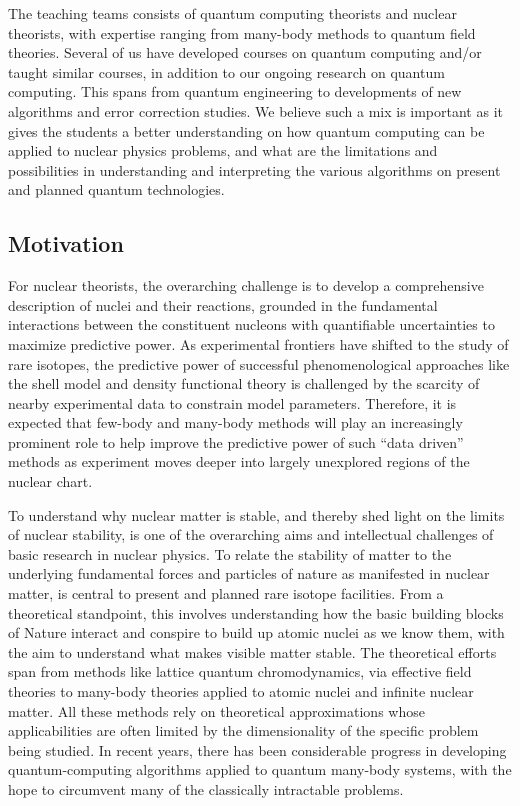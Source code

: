 \documentclass[superscriptaddress,amsmath,amssymb,aps,floatfix]{revtex4-2}
\begin{document}
The teaching teams consists of quantum computing theorists and nuclear
theorists, with expertise ranging from many-body methods to quantum
field theories. Several of us have developed courses on quantum
computing and/or taught similar courses, in addition to our ongoing
research on quantum computing. This spans from quantum engineering to
developments of new algorithms and error correction studies. We
believe such a mix is important as it gives the students a better
understanding on how quantum computing can be applied to nuclear
physics problems, and what are the limitations and possibilities in
understanding and interpreting the various algorithms on present and
planned quantum technologies.

\subsection{Motivation}\label{motivation}

For nuclear theorists, the overarching challenge is to develop a
comprehensive description of nuclei and their reactions, grounded in
the fundamental interactions between the constituent nucleons with
quantifiable uncertainties to maximize predictive power. As
experimental frontiers have shifted to the study of rare isotopes, the
predictive power of successful phenomenological approaches like the
shell model and density functional theory is challenged by the
scarcity of nearby experimental data to constrain model
parameters. Therefore, it is expected that few-body and many-body
methods will play an increasingly prominent role to help improve the
predictive power of such ``data driven'' methods as experiment moves
deeper into largely unexplored regions of the nuclear chart.

To understand why nuclear matter is stable, and thereby shed light on
the limits of nuclear stability, is one of the overarching aims and
intellectual challenges of basic research in nuclear physics. To
relate the stability of matter to the underlying fundamental forces
and particles of nature as manifested in nuclear matter, is central to
present and planned rare isotope facilities. From a theoretical
standpoint, this involves understanding how the basic building blocks
of Nature interact and conspire to build up atomic nuclei as we know
them, with the aim to understand what makes visible matter stable. The
theoretical efforts span from methods like lattice quantum
chromodynamics, via effective field theories to many-body theories
applied to atomic nuclei and infinite nuclear matter. All these
methods rely on theoretical approximations whose applicabilities are
often limited by the dimensionality of the specific problem being
studied. In recent years, there has been considerable progress in
developing quantum-computing algorithms applied to quantum many-body
systems, with the hope to circumvent many of the classically
intractable problems.
\end{document}
